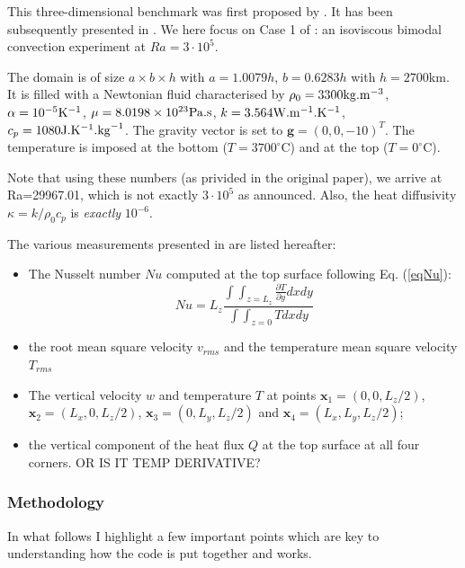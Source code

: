
This three-dimensional benchmark was first proposed by \cite{bucc93}. 
It has been subsequently presented in \cite{tack94,trha98,albe00,omma06,dawk11,krhb12}.
We here focus on Case 1 of \cite{bucc93}:  an isoviscous bimodal convection experiment at $Ra=3\cdot 10^5$.

The domain is of size $a\times b\times h$ with $a=1.0079h$, $b=0.6283h$ with $h=2700$km. It is filled with a Newtonian fluid characterised by $\rho_0=3300{\rm kg}.{\rm m}^{-3}$, $\alpha=10^{-5}{\rm K}^{-1}$, 
$\mu=8.0198\times10^{23}{\rm Pa.s}$, 
$k=3.564{\rm W}.{\rm m}^{-1}.{\rm K}^{-1}$, 
$c_p=1080{\rm J}.{\rm K}^{-1}.{\rm kg}^{-1}$.
The gravity vector is set to ${\bm g}=(0,0,-10)^T$.
The temperature is imposed at the bottom  ($T=3700^\circ$C) and at the top ($T=0^\circ$C).

Note that using these numbers (as privided in the original paper), we arrive at Ra=29967.01, which 
is not exactly $3\cdot10^5$ as announced. Also, the heat diffusivity $\kappa=k/\rho_0 c_p$ is 
{\it exactly} $10^{-6}$.

The various measurements presented in \cite{bucc93} are listed hereafter:
\begin{itemize}
\item The Nusselt number $Nu$ computed at the top surface following Eq. (\ref{eqNu}):
\[
Nu = L_z \frac{\int\int_{z=L_z} \frac{\partial T}{\partial y} dx dy  }{\int \int_{z=0} T dx dy}
\]
\item the root mean square velocity $v_{rms}$ and the temperature mean square velocity $T_{rms}$
\item The vertical velocity $w$ and temperature $T$ at points ${\bm x}_1=(0,0,L_z/2)$, ${\bm x}_2=(L_x,0,L_z/2)$,
${\bm x}_3=(0,L_y,L_z/2)$ and ${\bm x}_4=(L_x,L_y,L_z/2)$;
\item the vertical component of the heat flux $Q$ at the top surface  at all four corners. OR IS IT TEMP DERIVATIVE?
\end{itemize}

\subsubsection*{Methodology}

In what follows I highlight a few important points which are key to understanding how the code
is put together and works. 

